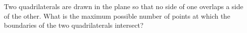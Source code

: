 Two quadrilaterals are drawn in the plane so that no side of one overlaps a side of the other. What is the maximum possible number of points at which the boundaries of the two quadrilaterals intersect?
